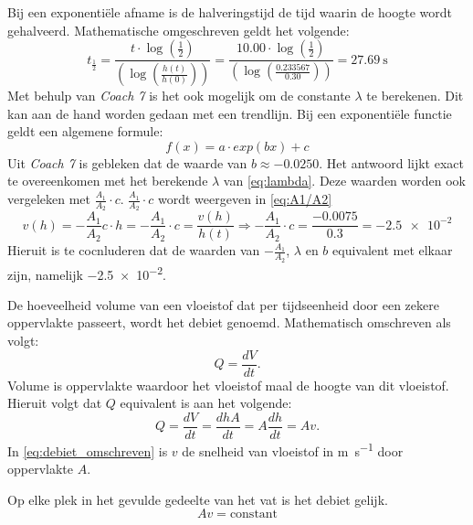 \documentclass{scrartcl}
\begin{document}
Bij een exponentiële afname is de halveringstijd de tijd waarin de hoogte wordt gehalveerd. Mathematische omgeschreven geldt het volgende:
\begin{equation}\label{eq:half}
t_{\frac{1}{2}} = \frac{t \cdot \log(\frac{1}{2})}{\left(\log \left(\frac{h(t)}{h(0)}\right)\right)} = \frac{10.00 \cdot \log(\frac{1}{2})}{\left(\log \left(\frac{0.233567}{0.30}\right)\right)} = \SI{27.69}{\second}
\end{equation}
Met behulp van \textit{Coach 7} is het ook mogelijk om de constante $\lambda$ te berekenen. Dit kan aan de hand worden gedaan met een trendlijn. Bij een exponentiële functie geldt een algemene formule:
\begin{equation}
    f(x) = a \cdot exp(bx) + c
\end{equation}
Uit \textit{Coach 7} is gebleken dat de waarde van $b \approx-0.0250$. Het antwoord lijkt exact te overeenkomen met het berekende $\lambda$ van \cref{eq:lambda}. Deze waarden worden ook vergeleken met $\frac{A_1}{A_2}\cdot c$. $\frac{A_1}{A_2}\cdot c$ wordt weergeven in 
\cref{eq:A1/A2}
\begin{equation}\label{eq:A1/A2}
    v(h) = -\frac{A_1}{A_2}c \cdot h = -\frac{A_1}{A_2} \cdot c = \frac{v(h)}{h(t)} \Rightarrow -\frac{A_1}{A_2} \cdot c = \frac{-0.0075}{0.3} = \num{-2.5e-2}
\end{equation}
Hieruit is te cocnluderen dat de waarden van $-\frac{A_1}{A_2}$, $\lambda$ en $b$ equivalent met elkaar zijn, namelijk \num{-2.5e-2}.









\newpage
De hoeveelheid volume van een vloeistof dat per tijdseenheid door een zekere oppervlakte passeert, wordt het debiet genoemd. Mathematisch omschreven als volgt:
\begin{equation}\label{eq:debiet}
    Q = \frac{dV}{dt}.
\end{equation}
Volume is oppervlakte waardoor het vloeistof maal de hoogte van dit vloeistof. Hieruit volgt dat $Q$ equivalent is aan het volgende:
\begin{equation}\label{eq:debiet_omschreven}
    Q = \frac{dV}{dt} = \frac{dhA}{dt} = A\frac{dh}{dt} = Av.
\end{equation}
In \cref{eq:debiet_omschreven} is $v$ de snelheid van vloeistof in \si{\meter\per\second} door oppervlakte $A$.

Op elke plek in het gevulde gedeelte van het vat is het debiet gelijk. 
\begin{equation}\label{eq:constant_debiet}
    Av = \text{constant}
\end{equation}
\end{document}
